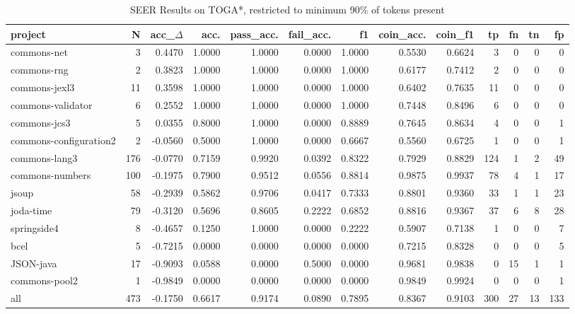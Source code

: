 \begin{table*}
\centering
\caption{SEER Results on TOGA*, restricted to minimum 90\% of tokens present}
\label{tab:toga_results_10}
\begin{tabular}{lrrrrrrrrrrrr}
\toprule
                project &    N &  acc\_$\Delta$ &    acc. &  pass\_acc. &  fail\_acc. &      f1 &  coin\_acc. &  coin\_f1 &   tp &  fn &  tn &   fp \\
\midrule
            commons-net &    3 &      0.4470 &  1.0000 &     1.0000 &     0.0000 &  1.0000 &     0.5530 &   0.6624 &    3 &   0 &   0 &    0 \\
            commons-rng &    2 &      0.3823 &  1.0000 &     1.0000 &     0.0000 &  1.0000 &     0.6177 &   0.7412 &    2 &   0 &   0 &    0 \\
          commons-jexl3 &   11 &      0.3598 &  1.0000 &     1.0000 &     0.0000 &  1.0000 &     0.6402 &   0.7635 &   11 &   0 &   0 &    0 \\
      commons-validator &    6 &      0.2552 &  1.0000 &     1.0000 &     0.0000 &  1.0000 &     0.7448 &   0.8496 &    6 &   0 &   0 &    0 \\
           commons-jcs3 &    5 &      0.0355 &  0.8000 &     1.0000 &     0.0000 &  0.8889 &     0.7645 &   0.8634 &    4 &   0 &   0 &    1 \\
 commons-configuration2 &    2 &     -0.0560 &  0.5000 &     1.0000 &     0.0000 &  0.6667 &     0.5560 &   0.6725 &    1 &   0 &   0 &    1 \\
          commons-lang3 &  176 &     -0.0770 &  0.7159 &     0.9920 &     0.0392 &  0.8322 &     0.7929 &   0.8829 &  124 &   1 &   2 &   49 \\
        commons-numbers &  100 &     -0.1975 &  0.7900 &     0.9512 &     0.0556 &  0.8814 &     0.9875 &   0.9937 &   78 &   4 &   1 &   17 \\
                  jsoup &   58 &     -0.2939 &  0.5862 &     0.9706 &     0.0417 &  0.7333 &     0.8801 &   0.9360 &   33 &   1 &   1 &   23 \\
              joda-time &   79 &     -0.3120 &  0.5696 &     0.8605 &     0.2222 &  0.6852 &     0.8816 &   0.9367 &   37 &   6 &   8 &   28 \\
            springside4 &    8 &     -0.4657 &  0.1250 &     1.0000 &     0.0000 &  0.2222 &     0.5907 &   0.7138 &    1 &   0 &   0 &    7 \\
                   bcel &    5 &     -0.7215 &  0.0000 &     0.0000 &     0.0000 &  0.0000 &     0.7215 &   0.8328 &    0 &   0 &   0 &    5 \\
              JSON-java &   17 &     -0.9093 &  0.0588 &     0.0000 &     0.5000 &  0.0000 &     0.9681 &   0.9838 &    0 &  15 &   1 &    1 \\
          commons-pool2 &    1 &     -0.9849 &  0.0000 &     0.0000 &     0.0000 &  0.0000 &     0.9849 &   0.9924 &    0 &   0 &   0 &    1 \\
                    all &  473 &     -0.1750 &  0.6617 &     0.9174 &     0.0890 &  0.7895 &     0.8367 &   0.9103 &  300 &  27 &  13 &  133 \\
\bottomrule
\end{tabular}
\end{table*}
